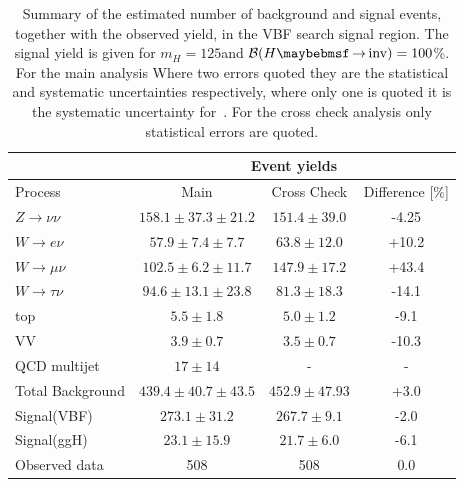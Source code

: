 \begin{table}[!htb]
\centering
\begin{tabular}{|l|c|c|c|}
\hline 
        & \multicolumn{3}{c|}{Event yields} \\
\hline
Process               & Main                      & Cross Check       & Difference [\%] \\
\hline\hline
$Z\rightarrow\nu\nu$  & $158.1 \pm 37.3 \pm 21.2$ & $151.4 \pm 39.0$  &           -4.25 \\
$W\rightarrow e\nu$   & $ 57.9 \pm 7.4  \pm  7.7$ &  $63.8 \pm 12.0$  &           +10.2 \\
$W\rightarrow\mu\nu$  & $102.5 \pm 6.2  \pm 11.7$ & $147.9 \pm 17.2$  &           +43.4 \\
$W\rightarrow\tau\nu$ & $ 94.6 \pm 13.1 \pm 23.8$ &  $81.3 \pm 18.3$  &           -14.1 \\
top                   & $  5.5 \pm 1.8$           &   $5.0 \pm 1.2$   &            -9.1 \\ 
VV                    & $  3.9 \pm 0.7$           &   $3.5 \pm 0.7$   &           -10.3 \\  
QCD multijet          & $   17 \pm 14$            &                -  &               - \\
\hline\hline                                                     
Total Background      & $439.4 \pm 40.7 \pm 43.5$ &   $452.9\pm47.93$ &            +3.0 \\
\hline\hline                                                     
Signal(VBF)           & $273.1 \pm 31.2 $         &   $267.7 \pm 9.1$ &            -2.0 \\
Signal(ggH)           & $ 23.1 \pm 15.9 $         &   $ 21.7 \pm 6.0$ &            -6.1 \\
\hline\hline                                                     
Observed data         & 508                       &               508 &             0.0 \\
\hline
\end{tabular}
\caption{Summary of the estimated number of background and signal events, together with the observed yield, in the \gls{VBF} search signal region. The signal yield is given for $m_H=125$\GeV and $\BRinv=100$\%. For the main analysis Where two errors quoted they are the statistical and systematic uncertainties respectively, where only one is quoted it is the systematic uncertainty for~\cite{ARTICLE:CMSVBFHiggsInvisibleParkedAnalysisPAS}. For the cross check analysis only statistical errors are quoted.}
\label{TABLE:ParkedDataAnalysis_Results_Summary}
\end{table}

